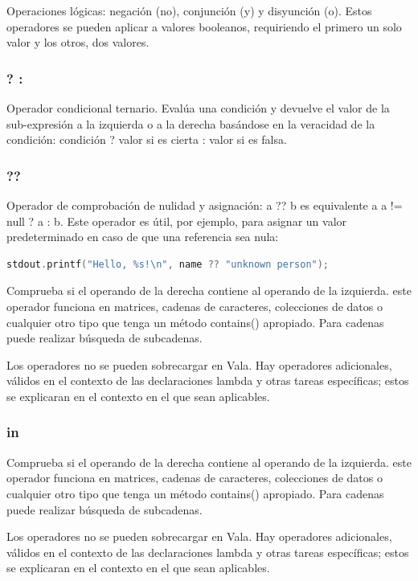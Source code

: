 \documentclass[12pt,twoside]{book}
\begin{document}
Operaciones lógicas: negación (no), conjunción (y) y disyunción (o). Estos operadores se pueden aplicar a valores booleanos, requiriendo el primero un solo valor y los otros, dos valores.

\subsubsection{? :}

Operador condicional ternario. Evalúa una condición y devuelve el valor de la sub-expresión a la izquierda o a la derecha basándose en la veracidad de la condición: condición ? valor si es cierta : valor si es falsa.

\subsubsection{??}
Operador de comprobación de nulidad y asignación: a ?? b es equivalente a a != null ? a : b. Este operador es útil, por ejemplo, para asignar un valor predeterminado en caso de que una referencia sea nula:

\begin{lstlisting}[language=C++]
stdout.printf("Hello, %s!\n", name ?? "unknown person");
\end{lstlisting}


Comprueba si el operando de la derecha contiene al operando de la izquierda. este operador funciona en matrices, cadenas de caracteres, colecciones de datos o cualquier otro tipo que tenga un método contains() apropiado. Para cadenas puede realizar búsqueda de subcadenas.

Los operadores no se pueden sobrecargar en Vala. Hay operadores adicionales, válidos en el contexto de las declaraciones lambda y otras tareas específicas; estos se explicaran en el contexto en el que sean aplicables.



\subsubsection{in}
Comprueba si el operando de la derecha contiene al operando de la izquierda. este operador funciona en matrices, cadenas de caracteres, colecciones de datos o cualquier otro tipo que tenga un método contains() apropiado. Para cadenas puede realizar búsqueda de subcadenas.

Los operadores no se pueden sobrecargar en Vala. Hay operadores adicionales, válidos en el contexto de las declaraciones lambda y otras tareas específicas; estos se explicaran en el contexto en el que sean aplicables.
\end{document}
